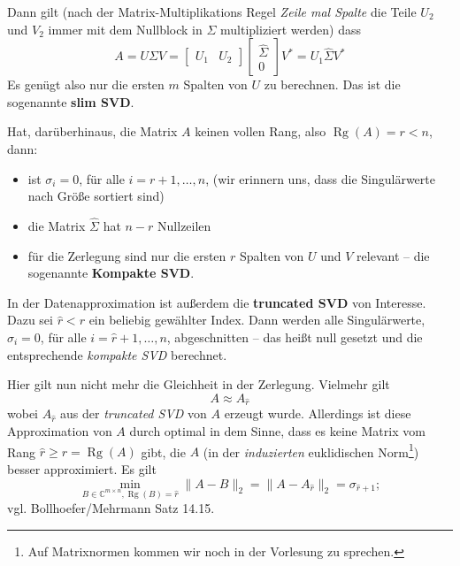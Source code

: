 \documentclass[]{book}
\providecommand{\tightlist}{%
  \setlength{\itemsep}{0pt}\setlength{\parskip}{0pt}}
\theoremstyle{definition}
\theoremstyle{definition}
\theoremstyle{definition}
\theoremstyle{definition}
\theoremstyle{remark}
\begin{document}
Dann gilt (nach der Matrix-Multiplikations Regel \emph{Zeile mal Spalte} die Teile \(U_2\) und \(V_2\) immer mit dem Nullblock in \(\Sigma\) multipliziert werden) dass
\begin{equation*}
A = U\Sigma V = 
\begin{bmatrix}
U_1 & U_2
\end{bmatrix}
\begin{bmatrix}
\hat \Sigma \\ 0
\end{bmatrix}
V^*
=
U_1 
\hat \Sigma
V^*
\end{equation*}
Es genügt also nur die ersten \(m\) Spalten von \(U\) zu berechnen. Das ist die sogenannte \textbf{slim SVD}.

Hat, darüberhinaus, die Matrix \(A\) keinen vollen Rang, also \(\operatorname{Rg}(A) = r < n\), dann:

\begin{itemize}
\tightlist
\item
  ist \(\sigma_i=0\), für alle \(i=r+1, \dotsc, n\), (wir erinnern uns, dass die Singulärwerte nach Größe sortiert sind)
\item
  die Matrix \(\hat \Sigma\) hat \(n-r\) Nullzeilen
\item
  für die Zerlegung sind nur die ersten \(r\) Spalten von \(U\) und \(V\) relevant -- die sogenannte \textbf{Kompakte SVD}.
\end{itemize}

In der Datenapproximation ist außerdem die \textbf{truncated SVD} von Interesse. Dazu sei \(\hat r<r\) ein beliebig gewählter Index. Dann werden alle Singulärwerte, \(\sigma_i=0\), für alle \(i=\hat r+1, \dotsc, n\), abgeschnitten -- das heißt null gesetzt und die entsprechende \emph{kompakte SVD} berechnet.

Hier gilt nun nicht mehr die Gleichheit in der Zerlegung. Vielmehr gilt
\begin{equation*}
A \approx A_{\hat r}
\end{equation*}
wobei \(A_{\hat r}\) aus der \emph{truncated SVD} von \(A\) erzeugt wurde. Allerdings ist diese Approximation von \(A\) durch optimal in dem Sinne, dass es keine Matrix vom Rang \(\hat r \geq r=\operatorname{Rg}(A)\) gibt, die \(A\) (in der \emph{induzierten} euklidischen Norm\footnote{Auf Matrixnormen kommen wir noch in der Vorlesung zu sprechen.}) besser approximiert. Es gilt
\begin{equation*}
\min_{B\in \mathbb C^{m\times n}, \operatorname{Rg}(B)=\hat r} \|A-B\|_2 = \|A-A_{\hat r}\|_2 = \sigma_{\hat r + 1};
\end{equation*}
vgl. Bollhoefer/Mehrmann Satz 14.15.
\end{document}
